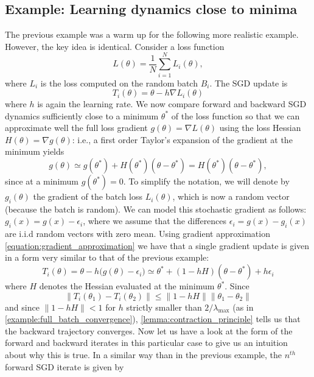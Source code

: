 \documentclass[10pt]{article} %
\theoremstyle{plain}
\theoremstyle{definition}
\theoremstyle{remark}
\begin{document}
\subsection{Example: Learning dynamics close to minima}

The previous example was a warm up for the following more realistic example. However, the key idea is identical. Consider a loss function
\[
    L(\theta)=\frac{1}{N}\sum_{i=1}^{N}L_{i}(\theta),
\]
where $L_{i}$ is the loss computed on the random batch $B_i$. The SGD update is
\[
    T_{i}(\theta)=\theta-h \nabla L_i(\theta)
\]
where $h$ is again the learning rate. We now compare forward and backward SGD dynamics sufficiently close to a minimum  $\theta^*$ of the loss function so that we can approximate well the full loss gradient $g(\theta) = \nabla L(\theta)$ using the loss Hessian $H(\theta) = \nabla g(\theta)$: i.e., a first order Taylor's expansion of the gradient at the minimum yields
\begin{equation}\label{equation:gradient_approximation}
    g(\theta) \simeq g(\theta^*) + H(\theta^*) (\theta - \theta^*) = H(\theta^*)(\theta - \theta^*),
\end{equation}
since at a minimum $g(\theta^*)  = 0$.
To simplify the notation, we will denote by $g_i(\theta)$ the gradient of the batch loss $L_i(\theta)$, which is now a random vector (because the batch is random). We can model this stochastic gradient as follows: $g_i(x) = g(x) - \epsilon_i$, where we assume that the  differences $\epsilon_i = g(x) - g_i(x)$ are i.i.d random vectors with zero mean. Using gradient approximation \cref{equation:gradient_approximation} we have that a single gradient update is given in a form very similar to that of the previous example:
\begin{equation*}
    T_i(\theta)  
    =  \theta - h\Big(g(\theta) - \epsilon_i\Big)
    \simeq \theta^* + (1 - h H)(\theta -\theta^*) + h \epsilon_i
\end{equation*}
where $H$ denotes the Hessian evaluated at the minimum $\theta^*$. Since 
\begin{equation*}
\|T_i(\theta_1) - T_i(\theta_2)\| \leq \|1 - hH\| \|\theta_1 - \theta_2\|
\end{equation*}
and since $\|1 - hH\| < 1$ for $h$ strictly smaller than $2/\lambda_{\mathrm{max}}$ (as in \cref{example:full_batch_convergence}), \cref{lemma:contraction_principle} tells us that the backward trajectory converges. Now let us have a look at the form of the forward and backward iterates in this particular case to give us an intuition about why this is true. In a similar way than in the previous example, the $n^{th}$ forward SGD iterate is given by
\end{document}
